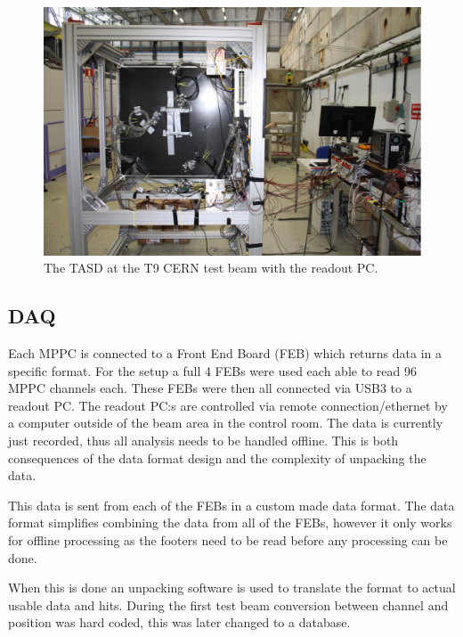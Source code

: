 \begin{figure}[h!]
\centering
\includegraphics[width=\textwidth]{figures/TASDinstrumented.jpeg}
\caption{The TASD at the T9 CERN test beam with the readout PC.}
\label{fig:TASDreal}
\end{figure}

\subsection{DAQ}
Each MPPC is connected to a Front End Board (FEB) which returns data in a specific format. For the setup a full 4 FEBs were used each able to read 96 MPPC channels each. These FEBs were then all connected via USB3 to a readout PC. The readout PC:s are controlled via remote connection/ethernet by a computer outside of the beam area in the control room. The data is currently just recorded, thus all analysis needs to be handled offline. This is both consequences of the data format design and the complexity of unpacking the data.


This data is sent from each of the FEBs in a custom made data format. The data format simplifies combining the data from all of the FEBs, however it only works for offline processing as the footers need to be read before any processing can be done.

When this is done an unpacking software is used to translate the format to actual usable data and hits. During the first test beam conversion between channel and position was hard coded, this was later changed to a database.  

